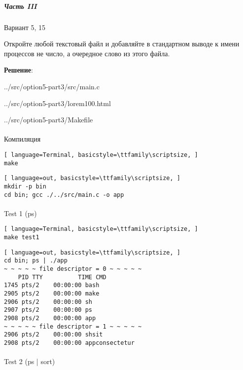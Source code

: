 \subparagraph{Часть III} Вариант 5, 15

Откройте любой текстовый файл и добавляйте в стандартном выводе к имени процессов не число, а очередное слово из этого файла.

\textbf{Решение}:


{../src/option5-part3/src/main.c}


{../src/option5-part3/lorem100.html}

\newpage


{../src/option5-part3/Makefile}

\paragraph{}
Компиляция

\begin{lstlisting}[ language=Terminal, basicstyle=\ttfamily\scriptsize, ]
make
\end{lstlisting}

\begin{lstlisting}[ language=out, basicstyle=\ttfamily\scriptsize, ]
mkdir -p bin
cd bin; gcc ./../src/main.c -o app
\end{lstlisting}

\paragraph{}
Test 1 (ps)

\begin{lstlisting}[ language=Terminal, basicstyle=\ttfamily\scriptsize, ]
make test1
\end{lstlisting}

\begin{lstlisting}[ language=out, basicstyle=\ttfamily\scriptsize, ]
cd bin; ps | ./app
~ ~ ~ ~ ~ file descriptor = 0 ~ ~ ~ ~ ~
    PID TTY          TIME CMD
1745 pts/2    00:00:00 bash
2905 pts/2    00:00:00 make
2906 pts/2    00:00:00 sh
2907 pts/2    00:00:00 ps
2908 pts/2    00:00:00 app
~ ~ ~ ~ ~ file descriptor = 1 ~ ~ ~ ~ ~
2906 pts/2    00:00:00 shsit
2908 pts/2    00:00:00 appconsectetur
\end{lstlisting}

\paragraph{}
Test 2 (ps | sort)

